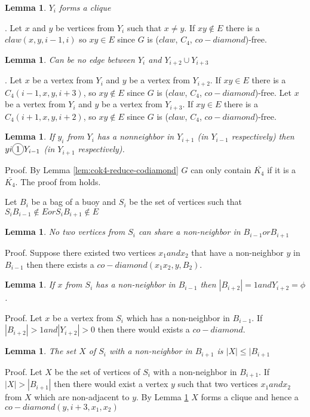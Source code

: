 \documentclass[12pt]{article}
\newcommand*\circled[1]{\tikz[baseline=(char.base)]{
            \node[shape=circle,draw,inner sep=2pt] (char) {#1};}}
\newtheorem{Lemma}[Theorem]{Lemma}
\def\CCD{($claw$, $C_4$, $co-diamond$)}
\begin{document}
\begin{Lemma}\label{lem:3K-clique}
$Y_i$ forms a clique
\end{Lemma}
. Let $x$ and $y$ be vertices from $Y_i$ such that $x \neq y$. If $xy \not \in E$ there is a $claw (x, y, i-1, i)$ so $xy \in E$ since $G$ is {\CCD}-free.

\begin{Lemma}\label{lem:yi-adjacency-yi2}
Can be no edge between $Y_i$ and $Y_{i+2} \cup Y_{i+3}$
\end{Lemma}
. Let $x$ be a vertex from $Y_i$ and $y$ be a vertex from $Y_{i+2}$. If $xy \in E$ there is a $C_4 (i-1, x, y, i+3)$, so $xy \not \in E$ since $G$ is {\CCD}-free. Let $x$ be a vertex from $Y_i$ and $y$ be a vertex from $Y_{i+3}$. If $xy \in E$ there is a $C_4 (i+1, x, y, i+2)$, so $xy \not \in E$ since $G$ is {\CCD}-free.

\begin{Lemma}\label{lem:yi-miss-two-neighbors}
If $y_i$ from $Y_i$ has a nonneighbor in $Y_{i+1}$ (in $Y_{i-1}$ respectively) then $yi \circled{1} Y_{i-1}$ (in $Y_{i+1}$ respectively).
\end{Lemma}
\noindent {\it} Proof. By Lemma \ref{lem:cok4-reduce-codiamond} $G$ can only contain $\overline{K_4}$ if it is a $\overline{K_4}$. The proof from \cite{BrEnLeLo} holds.


Let $B_i$ be a bag of a buoy and $S_i$ be the set of vertices such that $S_iB_{i-1} \not \in E or S_iB_{i+1} \not \in E$


\begin{Lemma}\label{lem:si-no-share-vertex}
No two vertices from $S_i$ can share a non-neighbor in $B_{i-1} or B_{i+1}$
\end{Lemma}
\noindent {\it} Proof. Suppose there existed two vertices $x_1 and x_2$ that have a non-neighbor $y$ in $B_{i-1}$ then there exists a $co-diamond (x_1x_2, y, B_2)$.

\begin{Lemma}\label{lem:buoy-3K-limit}
If $x$ from $S_i$ has a non-neighbor in $B_{i-1}$ then $|B_{i+2}| = 1 and Y_{i+2} = \phi$.  
\end{Lemma}
\noindent {\it} Proof. Let $x$ be a vertex from $S_i$ which has a non-neighbor in $B_{i-1}$. If $|B_{i+2}| > 1 and  |Y_{i+2}| > 0$  then there would exists a $co-diamond$.

\begin{Lemma}\label{lem:si-limit}
The set $X$ of $S_i$ with a non-neighbor in $B_{i+1}$ is $|X| \leq |B_{i+1}$ 
\end{Lemma}
\noindent {\it} Proof. Let $X$ be the set of vertices of $S_i$ with a non-neighbor in $B_{i+1}$. If $|X| > |B_{i+1}|$ then there would exist a vertex $y$ such that two vertices $x_1 and x_2$ from $X$ which are non-adjacent to $y$. By Lemma \ref{lem:3K-clique} $X$ forms a clique and hence a $co-diamond (y, i+3, x_1, x_2)$
\end{document}
